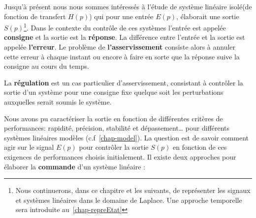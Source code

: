 Jusqu'à présent nous nous sommes intéressés à l'étude de système 
linéaire \og isolé\fg (de fonction de transfert $H(p)$) 
qui pour une entrée $E(p)$, élaborait une sortie $S(p)$\footnote{Nous
continuerons, dans ce chapitre et les suivants, de représenter 
les signaux et systèmes linéaires dans le domaine de Laplace. Une approche 
temporelle sera introduite au~\cref{chap-repreEtat}}. Dans le contexte du 
contrôle de ces systèmes l'entrée est appelée \textbf{consigne} et la sortie
est la \textbf{réponse}. La différence entre l'entrée et la sortie est 
appelée \textbf{l'erreur}. Le problème de \textbf{l'asservissement} consiste 
alors à annuler cette erreur à chaque instant ou encore à faire en sorte que 
la réponse suive la consigne au cours du temps.

La \textbf{régulation} est un cas particulier d'asservissement, consistant
à contrôler la sortie d'un système pour une consigne fixe quelque soit 
les perturbations auxquelles serait soumis le système.
\begin{center}
    
\end{center}
Nous avons pu caractériser la sortie en fonction de différentes 
critères de performances: rapidité, précision, stabilité et dépassement\ldots
pour différents systèmes linéaires modèles (c.f~\cref{chap-model}). 
La question est de savoir comment agir sur le 
signal $E(p)$ pour contrôler la sortie $S(p)$ en fonction de 
ces exigences de performances choisis initialement.
\newpage
\restoregeometry
\captionsetup{width=0.9\linewidth}
Il existe deux approches pour élaborer la \textbf{commande} 
d'un système linéaire :%
